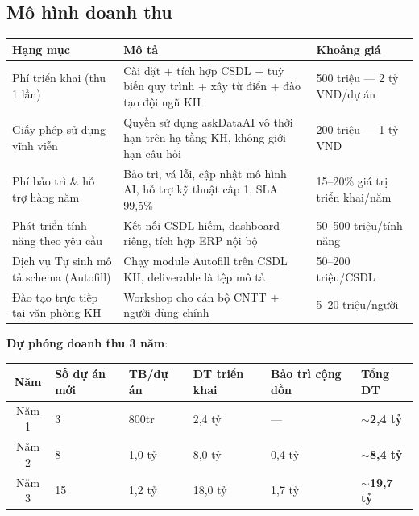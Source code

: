 \documentclass[11pt,a4paper]{article}
\begin{document}
\subsection{Mô hình doanh thu}

\begin{longtable}{|L{3.5cm}|L{6.5cm}|L{4cm}|}
\hline
{}\textbf{Hạng mục} & \textbf{Mô tả} & \textbf{Khoảng giá} \\
\hline\endhead

Phí triển khai (thu 1 lần) & Cài đặt + tích hợp CSDL + tuỳ biến quy trình + xây từ điển + đào tạo đội ngũ KH & 500 triệu --- 2 tỷ VND/dự án \\ \hline
Giấy phép sử dụng vĩnh viễn & Quyền sử dụng askDataAI vô thời hạn trên hạ tầng KH, không giới hạn câu hỏi & 200 triệu --- 1 tỷ VND \\ \hline
Phí bảo trì \& hỗ trợ hàng năm & Bảo trì, vá lỗi, cập nhật mô hình AI, hỗ trợ kỹ thuật cấp 1, SLA 99,5\% & 15--20\% giá trị triển khai/năm \\ \hline
Phát triển tính năng theo yêu cầu & Kết nối CSDL hiếm, dashboard riêng, tích hợp ERP nội bộ & 50--500 triệu/tính năng \\ \hline
Dịch vụ Tự sinh mô tả schema (Autofill) & Chạy module Autofill trên CSDL KH, deliverable là tệp mô tả & 50--200 triệu/CSDL \\ \hline
Đào tạo trực tiếp tại văn phòng KH & Workshop cho cán bộ CNTT + người dùng chính & 5--20 triệu/người \\ \hline

\end{longtable}

\textbf{Dự phóng doanh thu 3 năm}:

\begin{center}
\begin{tabular}{|c|R{1.7cm}|R{1.7cm}|R{1.7cm}|R{2.7cm}|R{2.3cm}|}
\hline
{}\textbf{Năm} & \textbf{Số dự án mới} & \textbf{TB/dự án} & \textbf{DT triển khai} & \textbf{Bảo trì cộng dồn} & \textbf{Tổng DT} \\
\hline
Năm 1 & 3 & 800tr & 2,4 tỷ & --- & \textbf{$\sim$2,4 tỷ} \\ \hline
Năm 2 & 8 & 1,0 tỷ & 8,0 tỷ & 0,4 tỷ & \textbf{$\sim$8,4 tỷ} \\ \hline
Năm 3 & 15 & 1,2 tỷ & 18,0 tỷ & 1,7 tỷ & \textbf{$\sim$19,7 tỷ} \\
\hline
\end{tabular}
\end{center}
\end{document}
